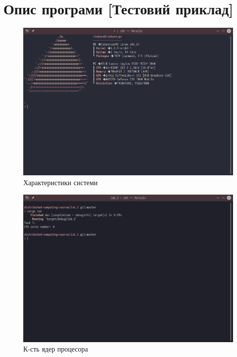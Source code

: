 \documentclass{udstu}
\begin{document}
\chapter{Опис програми [Тестовий приклад]}
\label{chap:3}

\begin{figure}[!htp]
	\centering
	\includegraphics[scale=0.5]{PNG/system-specs.png}
	\caption{Характеристики системи}
	\label{fig:figure1}
\end{figure}

\begin{figure}[!htp]
	\centering
	\includegraphics[scale=0.5]{PNG/thread-num-test.png}
	\caption{К-сть ядер процесора}
	\label{fig:figure1}
\end{figure}
\end{document}
